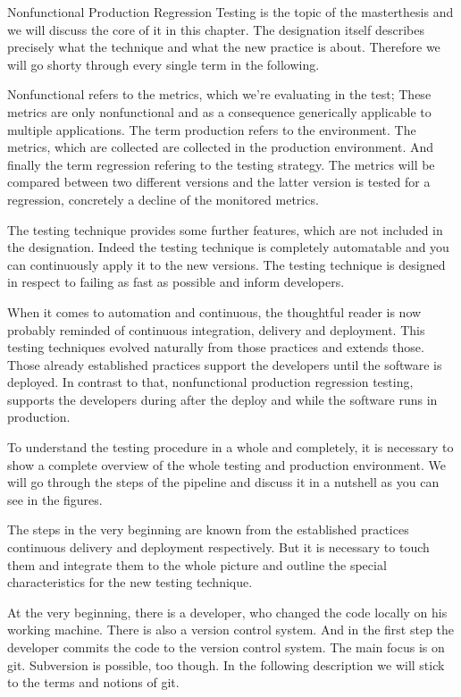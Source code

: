 Nonfunctional Production Regression Testing is the topic of the masterthesis and we will
discuss the core of it in this chapter. The designation itself describes precisely what
the technique and what the new practice is about. Therefore we will go shorty through
every single term in the following.

Nonfunctional refers to the metrics, which we're evaluating in the test; These metrics are
only nonfunctional and as a consequence generically applicable to multiple
applications. The term production refers to the environment. The metrics, which are
collected are collected in the production environment. And finally the term regression
refering to the testing strategy. The metrics will be compared between two different
versions and the latter version is tested for a regression, concretely a decline of the
monitored metrics.

The testing technique provides some further features, which are not included in the
designation. Indeed the testing technique is completely automatable and you can
continuously apply it to the new versions. The testing technique is designed in respect to
failing as fast as possible and inform developers.

When it comes to automation and continuous, the thoughtful reader is now probably reminded
of continuous integration, delivery and deployment. This testing techniques evolved
naturally from those practices and extends those. Those already established practices
support the developers until the software is deployed. In contrast to that, nonfunctional
production regression testing, supports the developers during after the deploy and while
the software runs in production.

To understand the testing procedure in a whole and completely, it is necessary to show a
complete overview of the whole testing and production environment. We will go through the
steps of the pipeline and discuss it in a nutshell as you can see in the figures.

The steps in the very beginning are known from the established practices continuous
delivery and deployment respectively. But it is necessary to touch them and integrate them
to the whole picture and outline the special characteristics for the new testing
technique.

At the very beginning, there is a developer, who changed the code locally on his working
machine. There is also a version control system. And in the first step the developer
commits the code to the version control system. The main focus is on git. Subversion is
possible, too though. In the following description we will stick to the terms and notions
of git.

